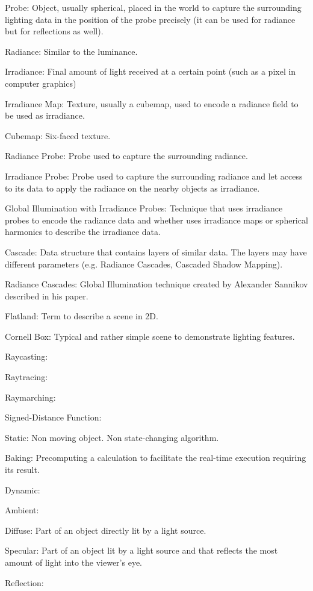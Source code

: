 \documentclass{rapportCS}
\begin{document}
Probe: Object, usually spherical, placed in the world to capture the surrounding lighting data in the position of the probe precisely (it can be used for radiance but for reflections as well).

Radiance: Similar to the luminance.

Irradiance: Final amount of light received at a certain point (such as a pixel in computer graphics)

Irradiance Map: Texture, usually a cubemap, used to encode a radiance field to be used as irradiance.

Cubemap: Six-faced texture.

Radiance Probe: Probe used to capture the surrounding radiance.

Irradiance Probe: Probe used to capture the surrounding radiance and let access to its data to apply the radiance on the nearby objects as irradiance.

Global Illumination with Irradiance Probes: Technique that uses irradiance probes to encode the radiance data and whether uses irradiance maps or spherical harmonics to describe the irradiance data.

Cascade: Data structure that contains layers of similar data. The layers may have different parameters (e.g. Radiance Cascades, Cascaded Shadow Mapping).

Radiance Cascades: Global Illumination technique created by Alexander Sannikov described in his paper.

Flatland: Term to describe a scene in 2D.

Cornell Box: Typical and rather simple scene to demonstrate lighting features.

Raycasting:

Raytracing:

Raymarching:

Signed-Distance Function:

Static: Non moving object. Non state-changing algorithm.

Baking: Precomputing a calculation to facilitate the real-time execution requiring its result.

Dynamic:

Ambient:

Diffuse: Part of an object directly lit by a light source.

Specular: Part of an object lit by a light source and that reflects the most amount of light into the viewer’s eye.

Reflection:
\end{document}
